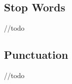 \documentclass[11pt, a4paper]{article}
\begin{document}
\subsection{Stop Words}

//todo

\subsection{Punctuation}

//todo



\end{document}
